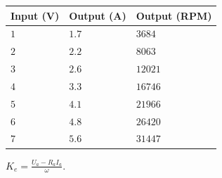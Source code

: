 \begin{table}[H]
\begin{tabular}{|l|l|l|}
\hline%
  \textbf{Input (V)}  & \textbf{Output (A)} & \textbf{Output (RPM)} \\
\hline%
  $1$                 &            $1.7$  &  $3684$                 \\
\hline%
  $2$                 &            $2.2$  &  $8063$                 \\
\hline%
  $3$                 &            $2.6$  &  $12021$                \\
\hline%
  $4$                 &            $3.3$  &  $16746$                \\
\hline%
  $5$                 &            $4.1$  &  $21966$                \\
\hline%
  $6$                 &            $4.8$  &  $26420$                \\
\hline%
  $7$                 &            $5.6$  &  $31447$                \\
\hline%
\end{tabular}
\end{table}

$K_e = \frac{U_a - R_a I_a}{\omega}$.